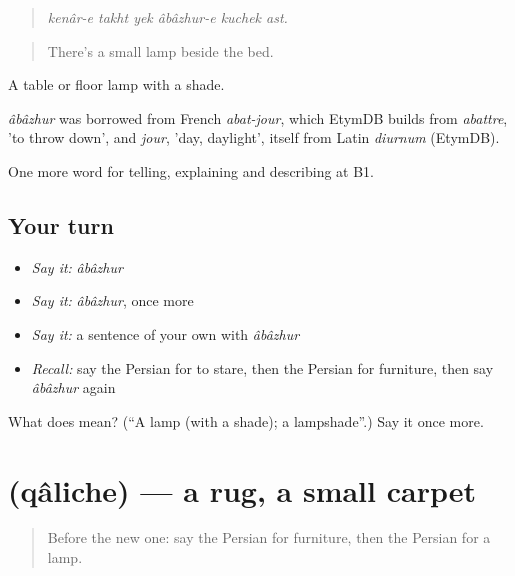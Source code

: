 \begin{quote}
\emph{kenâr-e takht yek âbâzhur-e kuchek ast.}
\end{quote}

\begin{quote}
There's a small lamp beside the bed.
\end{quote}

A table or floor lamp with a shade.

\begin{cousinweb}
\emph{âbâzhur} was borrowed from French \emph{abat-jour}, which EtymDB builds from \emph{abattre}, 'to throw down', and \emph{jour}, 'day, daylight', itself from Latin \emph{diurnum} (EtymDB).
\end{cousinweb}

\begin{grammarlens}[title={What you've built}]
One more word for telling, explaining and describing at B1.
\end{grammarlens}

\subsection*{Your turn}
\begin{itemize}
\raggedright
  \item \emph{Say it:} \emph{âbâzhur}
  \item \emph{Say it:} \emph{âbâzhur}, once more
  \item \emph{Say it:} a sentence of your own with \emph{âbâzhur}
  \item \emph{Recall:} say the Persian for to stare, then the Persian for furniture, then say \emph{âbâzhur} again
\end{itemize}

\begin{tcolorbox}[breakable,colback=teal!4,colframe=teal!35!black,title={Before you move on}]
What does  mean? (\textquotedblleft{}A lamp (with a shade); a lampshade\textquotedblright{}.) Say it once more.
\end{tcolorbox}
\section[\texorpdfstring{\fa{قالیچه} (qâliche)}{قالیچه (qâliche)}]{ (qâliche) — a rug, a small carpet}

\label{lesson:FA-C534-qaliche}



\begin{quote}
Before the new one: say the Persian for furniture, then the Persian for a lamp.
\end{quote}


